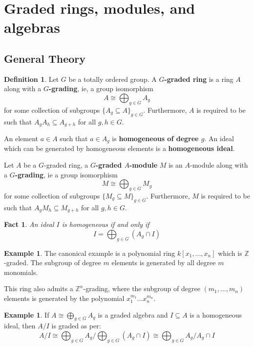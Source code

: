 \documentclass[12pt]{article}
\theoremstyle{plain}
\newtheorem{fact}[thm]{Fact}
\theoremstyle{definition}
\newtheorem{defn}[thm]{Definition} %
\newtheorem{example}[thm]{Example}
\newcommand{\bb}[1]{\mathbb{#1}}
\begin{document}
\section{Graded rings, modules, and algebras}\label{Sec:Graded}
\subsection{General Theory}
\begin{defn}
Let $G$ be a totally ordered group. A \textbf{$G$-graded ring} is a ring $A$ along with a \textbf{$G$-grading}, ie, a group isomorphism
\begin{equation}
A \cong \bigoplus_{g \in G}A_g
\end{equation}
for some collection of subgroups $\lbrace A_g \subseteq A \rbrace_{g \in G}$. Furthermore, $A$ is required to be such that $A_gA_h \subseteq A_{g + h}$ for all $g,h \in G$.

An element $a \in A$ such that $a \in A_g$ is \textbf{homogeneous of degree $g$}. An ideal which can be generated by homogeneous elements is a \textbf{homogeneous ideal}.

Let $A$ be a $G$-graded ring, a \textbf{$G$-graded $A$-module} $M$ is an $A$-module along with a \textbf{$G$-grading}, ie a group isomorphism
\begin{equation}
M \cong \bigoplus_{g \in G} M_g
\end{equation}
for some collection of subgroups $\lbrace M_g \subseteq M\rbrace_{g \in G}$. Furthermore, $M$ is required to be such that $A_gM_h \subseteq M_{g + h}$ for all $g,h \in G$.
\end{defn}
\begin{fact}
An ideal $I$ is homogeneous if and only if
\begin{equation}
I = \bigoplus_{g \in G}(A_g \cap I)
\end{equation}
\end{fact}
\begin{example}
The canonical example is a polynomial ring $k[x_1,...,x_n]$ which is $\bb{Z}$-graded. The subgroup of degree $m$ elements is generated by all degree $m$ monomials.

This ring also admits a $\bb{Z}^n$-grading, where the subgroup of degree $(m_1,...,m_n)$ elements is generated by the polynomial $x^{m_1}_1...x^{m_n}_n$.
\end{example}
\begin{example}\label{ex:quotient_of_homog_by_homog}
If $A \cong \bigoplus_{g \in G}A_g$ is a graded algebra and $I \subseteq A$ is a homogeneous ideal, then $A/I$ is graded as per:
\begin{equation}
A/I \cong \bigoplus_{g \in G}A_g/\bigoplus_{g \in G}(A_g \cap I) \cong \bigoplus_{g \in G}A_g/A_g \cap I
\end{equation}
\end{example}
\end{document}
